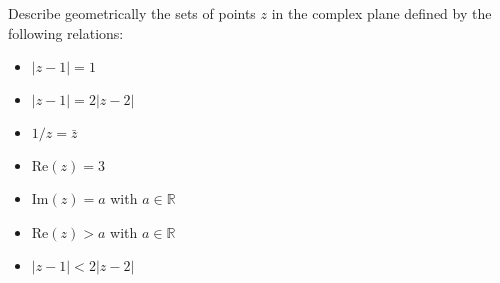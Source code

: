 \documentclass[12pt]{article}
\newenvironment{statement}[2][Statement]{\begin{trivlist}
\item[\hskip \labelsep {\bfseries #1}\hskip \labelsep {\bfseries #2.}]}{\end{trivlist}}
\begin{document}
\begin{statement}[Problem]{1}
  Describe geometrically the sets of points $z$ in the complex plane defined by the 
  following relations:
  \begin{itemize}
    \item[(a)] $| z - 1 |=1$
    \item[(b)] $| z - 1 | = 2 | z - 2|$
    \item[(c)]$1 / z = \bar{z}$
    \item[(d)]$\text{Re}(z) = 3$ 
    \item[(e)] $\text{Im}(z) = a$ with $a \in \mathbb{R}$ 
    \item[(f)] $\text{Re}(z) > a$ with $a \in \mathbb{R}$ 
    \item[(g)] $| z - 1| < 2|z - 2|$
  \end{itemize}
\end{statement}
\end{document}
